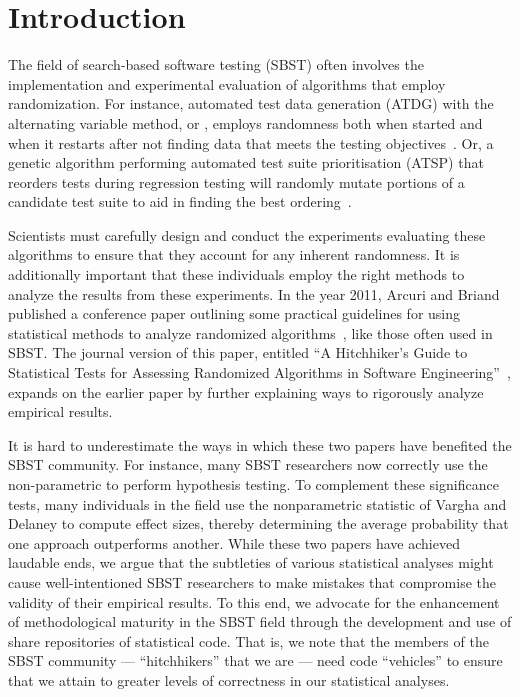 
\section{Introduction}
\label{sec:introduction}

The field of search-based software testing (SBST) often involves the implementation and experimental evaluation of
algorithms that employ randomization. For instance, automated test data generation (ATDG) with the alternating variable
method, or \AVM, employs randomness both when started and when it restarts after not finding data that meets the testing
objectives~\cite{McMinn2015}. Or, a genetic algorithm performing automated test suite prioritisation (ATSP) that
reorders tests during regression testing will randomly mutate portions of a candidate test suite to aid in finding the
best ordering~\cite{Walcott2006}.

Scientists must carefully design and conduct the experiments evaluating these algorithms to ensure that they account for
any inherent randomness. It is additionally important that these individuals employ the right methods to analyze the
results from these experiments. In the year 2011, Arcuri and Briand published a conference paper outlining some
practical guidelines for using statistical methods to analyze randomized algorithms~\cite{Arcuri2011}, like those often
used in SBST. The journal version of this paper, entitled ``A Hitchhiker's Guide to Statistical Tests for Assessing
Randomized Algorithms in Software Engineering''~\cite{Arcuri2014}, expands on the earlier paper by further explaining
ways to rigorously analyze empirical results.

It is hard to underestimate the ways in which these two papers have benefited the SBST community. For instance, many
SBST researchers now correctly use the non-parametric \wilcoxon to perform hypothesis testing. To complement these
significance tests, many individuals in the field use the nonparametric \atwelve statistic of Vargha and Delaney
\cite{Vargha2000} to compute effect sizes, thereby determining the average probability that one approach outperforms
another. While these two papers have achieved laudable ends, we argue that the subtleties of various statistical
analyses might cause well-intentioned SBST researchers to make mistakes that compromise the validity of their empirical
results. To this end, we advocate for the enhancement of methodological maturity in the SBST field through the development
and use of share repositories of statistical code. That is, we note that the members of the SBST community ---
``hitchhikers'' that we are --- need code ``vehicles'' to ensure that we attain to greater levels of correctness in our
statistical analyses.

